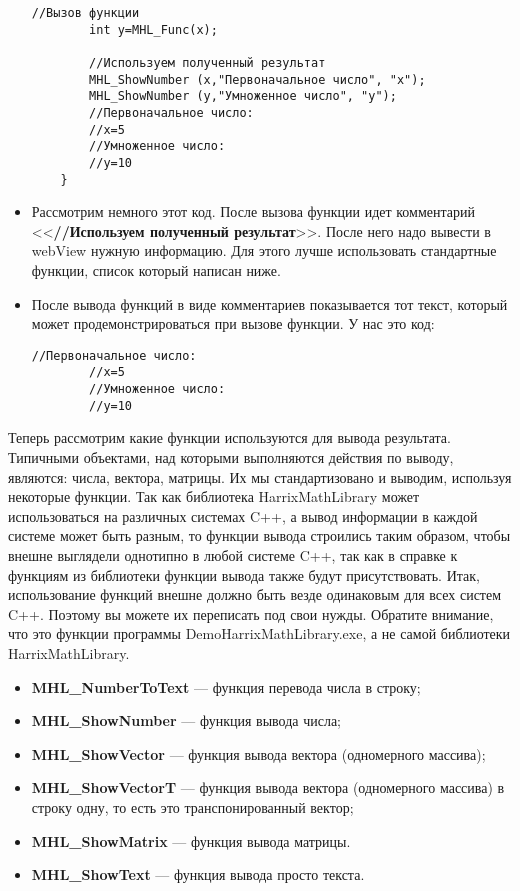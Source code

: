 \begin{itemize}
\begin{lstlisting}[label=examplefunction08, caption=Добавление демонстрации работы функции на примере]
        //Вызов функции
        int y=MHL_Func(x);

        //Используем полученный результат
        MHL_ShowNumber (x,"Первоначальное число", "x");
        MHL_ShowNumber (y,"Умноженное число", "y");
        //Первоначальное число:
        //x=5
        //Умноженное число:
        //y=10
    }
\end{lstlisting}
\item Рассмотрим немного этот код. После вызова функции идет комментарий <<\textbf{//Используем полученный результат}>>. После него надо вывести в webView нужную информацию. Для этого лучше использовать стандартные функции, список который написан ниже.
\item  После вывода функций в виде комментариев показывается тот текст, который может продемонстрироваться при вызове функции. У нас это код:
\begin{lstlisting}[label=examplefunction09, caption=Закомментированный результат работы функции]
        //Первоначальное число:
        //x=5
        //Умноженное число:
        //y=10
\end{lstlisting}
\end{itemize}

Теперь рассмотрим какие функции используются для вывода результата. Типичными объектами, над которыми выполняются действия по выводу, являются: числа, вектора, матрицы. Их мы стандартизовано и выводим, используя некоторые функции. Так как библиотека HarrixMathLibrary может использоваться на различных системах C++, а вывод информации в каждой системе может быть разным, то функции вывода строились таким образом, чтобы внешне выглядели однотипно в любой системе C++, так как в справке к функциям из библиотеки функции вывода также будут присутствовать. Итак, использование функций внешне должно быть везде одинаковым для всех систем C++.  Поэтому вы можете их переписать под свои нужды. Обратите внимание, что это функции программы DemoHarrixMathLibrary.exe, а не самой библиотеки HarrixMathLibrary.

\begin{itemize}
\item \textbf{MHL\_NumberToText} --- функция перевода числа в строку; 
\item \textbf{MHL\_ShowNumber} --- функция вывода числа;
\item \textbf{MHL\_ShowVector} --- функция вывода вектора (одномерного массива);
\item \textbf{MHL\_ShowVectorT} --- функция вывода вектора (одномерного массива) в строку одну, то есть это транспонированный вектор;
\item \textbf{MHL\_ShowMatrix} --- функция вывода матрицы.
\item \textbf{MHL\_ShowText} --- функция вывода просто текста.
\end{itemize}

